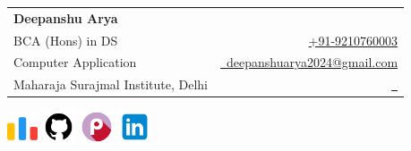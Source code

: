 \documentclass[a4paper,11pt]{article}
\makeatletter
\newcommand{\name}{Deepanshu Arya} %
\newcommand{\course}{BCA (Hons) in DS} %
\newcommand{\roll}{04014902021} %
\newcommand{\phone}{9210760003} %
\newcommand{\emaila}{deepanshuarya2024@gmail.com} %
\newcommand{\emailb}{} %
\makeatother
\begin{document}


\parbox{2.4cm}{%
}
\parbox{\dimexpr\linewidth-2.8cm\relax}{
\begin{tabularx}{\linewidth}{L r} \\
  \textbf{\Large \name} \\
  \course & {\raisebox{0.0\height}{\footnotesize \faPhone}\ \href{callto:\phone}{+91-\phone}}\\
  {Computer Application} &  \href{personal mail:\emaila}{\raisebox{0.0\height}{\footnotesize \faEnvelope}\ {\emaila}} \\
  {Maharaja Surajmal Institute, Delhi} &  \href{college mail:\emailb}{\raisebox{0.0\height}{\footnotesize  }\ {}}\\
\end{tabularx}
\vspace{-5.0mm}
}
\parbox{18.6cm}{%
\flushright
\vspace{-6.5mm}
\href{https://leetcode.com/sudo_arya/}{\includegraphics[width=0.9cm,clip]{codeforces.png}}
\hspace{0.5em}
\href{https://github.com/sudo-arya/}{\includegraphics[width=1cm,clip]{icons8-github-480.png}}
\hspace{0.5em}
\href{https://play.picoctf.org/users/sudo_arya}{\includegraphics[width=1cm,clip]{picoCTF_logo.jpeg}}
\hspace{0.5em}
\href{https://www.linkedin.com/in/deepanshu-arya-2931a822b/}{\includegraphics[width=1cm,clip]{icons8-linked-in-480.png}}
\hspace{0.5em}
}
\vspace{-8.0mm}
\end{document}
